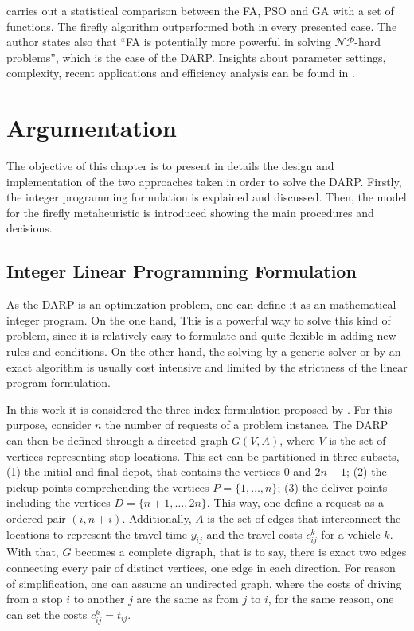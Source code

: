 \documentclass[tuberlin,cic,tc,openright,english,noabntcite,oneside]{iiufrgs}
\begin{document}
\textcite[p. 177]{yang_firefly_2009} carries out a statistical comparison between the FA, PSO and GA with a set of functions. The firefly algorithm outperformed both in every presented case. The author states also that \enquote{FA is potentially more powerful in solving $\mathcal{NP}$-hard problems}, which is the case of the DARP. Insights about parameter settings, complexity, recent applications and efficiency analysis can be found in \textcite{yang_firefly_2013}.

\chapter{Argumentation}
The objective of this chapter is to present in details the design and implementation of the two approaches taken in order to solve the DARP. Firstly, the integer programming formulation is explained and discussed. Then, the model for the firefly metaheuristic is introduced showing the main procedures and decisions.

\section{Integer Linear Programming Formulation}
As the DARP is an optimization problem, one can define it as an mathematical integer program. On the one hand, This is a powerful way to solve this kind of problem, since it is relatively easy to formulate and quite flexible in adding new rules  and conditions. On the other hand, the solving by a generic solver or by an exact algorithm is usually cost intensive and limited by the strictness of the linear program formulation.

In this work it is considered the three-index formulation proposed by \textcite[p. 574-575]{cordeau_branch-and-cut_2006}. For this purpose, consider $n$ the number of requests of a problem instance. The DARP can then be defined through a directed graph $G(V,A)$, where $V$ is the set of vertices representing stop locations. This set can be partitioned in three subsets, (1) the initial and final depot, that contains the vertices $0$ and $2n+1$; (2) the pickup points comprehending the vertices $P=\{1,\dotsc,n\}$; (3) the deliver points including the vertices $D=\{n+1,\dotsc,2n\}$. This way, one define a request as a ordered pair $(i,n+i)$. Additionally, $A$ is the set of edges that interconnect the locations to represent the travel time $y_{ij}$ and the travel costs $c_{ij}^{k}$ for a vehicle $k$. With that, $G$ becomes a complete digraph, that is to say, there is exact two edges connecting every pair of distinct vertices, one edge in each direction. For reason of simplification, one can assume an undirected graph, where the costs of driving from a stop $i$ to another $j$ are the same as from $j$ to $i$, for the same reason, one can set the costs $c_{ij}^{k} = t_{ij}$.
\end{document}
